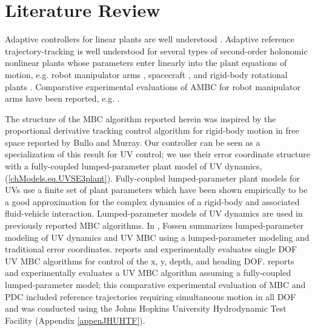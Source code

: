 \section{Literature Review}
 
Adaptive controllers for linear plants are
well understood 
\cite{ksn&anu.book}.
% 
Adaptive reference trajectory-tracking is well
understood for several types of second-order holonomic nonlinear
plants whose parameters enter linearly into the plant equations of
motion, e.g. robot manipulator arms
\cite{Craig&hsu&sastry.ijrr87,slotine&li.ijrr87,horowitz&sadegh.ijrr90},
 spacecraft \cite{kod.cdc85a,slotine1990},
and  rigid-body rotational plants \cite{Chaturvedi2006}.
%
Comparative experimental evaluations of \ac{AMBC} for robot manipulator
arms have been reported, e.g. \cite{slotine.performance,whitcomb&kod.tra93}.



The structure of the \ac{MBC} algorithm reported herein was
inspired by the proportional derivative tracking control algorithm for
rigid-body motion in free space reported by Bullo and
Murray\cite{bullo1995_SE3_PD}.
%
Our controller can be seen as a specialization of this result for
\ac{UV} control; we use their error coordinate structure with a
fully-coupled lumped-parameter plant model of \ac{UV} dynamics,
(\ref{chModels.eq.UVSE3plant}).
%
Fully-coupled lumped-parameter plant models for \acp{UV} use a finite
set of plant parameters which have been shown empirically to be a good
approximation for the complex dynamics of a rigid-body and
associated fluid-vehicle interaction.
%
Lumped-parameter models of \ac{UV} dynamics are used in previously
reported \ac{MBC} algorithms.
%
In \cite{fossen}, Fossen summarizes lumped-parameter modeling of
\ac{UV} dynamics and \ac{UV} \ac{MBC} using a lumped-parameter
modeling and traditional error coordinates.
%
\cite{smallwood2004JOE} reports and experimentally evaluates 
single \ac{DOF} \ac{UV} \ac{MBC} algorithms for control of the 
x, y, depth, and heading \ac{DOF}.
%
\cite{martinControl_ICRA13} reports and experimentally evaluates a
\ac{UV} \ac{MBC} algorithm assuming a fully-coupled lumped-parameter
model; this comparative experimental evaluation of \ac{MBC} and
\ac{PDC} included reference trajectories requiring simultaneous motion
in all \ac{DOF} and was conducted using the Johns Hopkins University
Hydrodynamic Test Facility (Appendix \ref{appenJHUHTF}).



